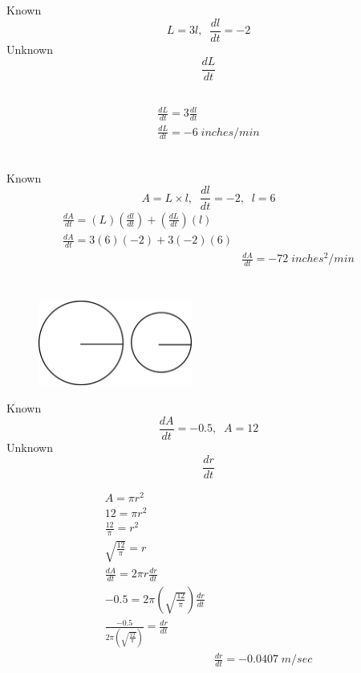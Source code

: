\documentclass[16pt letter]{article}
\begin{document}
Known \[L = 3l, \;\; \frac{dl}{dt} = -2\]
Unknown \[\frac{dL}{dt}\]

\subsection{}
\begin{align*}
	\frac{dL}{dt} = 3\frac{dl}{dt}   \\
	\frac{dL}{dt} = -6 \; inches/min \\
\end{align*}

\subsection{}
Known \[A = L  \times l, \;\; \frac{dl}{dt} = -2,\;\; l = 6\]
\begin{align*}
	\frac{dA}{dt} = (L)(\frac{dl}{dt}) + (\frac{dL}{dt})(l) \\
	\frac{dA}{dt} = 3(6)(-2) + 3(-2)(6)                     \\
	 & \frac{dA}{dt} = -72 \; inches^2/min
\end{align*}
\pagebreak

\section{}
\label{q:9}
\begin{figure}[h]
	\centering
	\includegraphics[width=0.45\textwidth]{Application Q9}
\end{figure}
Known \[\frac{dA}{dt} = -0.5, \;\; A = 12\]
Unknown \[\frac{dr}{dt}\]

\begin{align*}
	A = \pi r^2                                                 \\
	12 = \pi r^2                                                \\
	\frac{12}{\pi } = r^2                                       \\
	\sqrt{\frac{12}{\pi }} = r                                  \\[20pt]
	\frac{dA}{dt} = 2 \pi r \frac{dr}{dt}                       \\
	-0.5 = 2 \pi (\sqrt{\frac{12}{\pi }})\frac{dr}{dt}          \\
	\frac{-0.5}{2 \pi (\sqrt{\frac{12}{\pi }})} = \frac{dr}{dt} \\
	 & \frac{dr}{dt} = -0.0407\; m/sec
\end{align*}
\pagebreak
\end{document}
